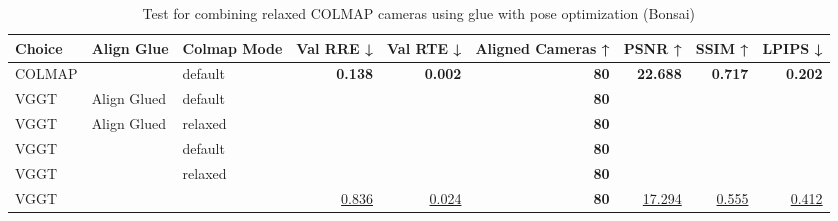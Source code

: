 \begin{table}[H]
\caption{Test for combining relaxed COLMAP cameras using glue with pose optimization (Bonsai)}
\label{tab:99_align_glue_relaxed_pose_opt_bonsai}
\begin{tabular}{lllrrrrrr}
\toprule
Choice & Align Glue & Colmap Mode & Val RRE ↓ & Val RTE ↓ & Aligned Cameras ↑ & PSNR ↑ & SSIM ↑ & LPIPS ↓ \\
\midrule
COLMAP &  & default & \textbf{0.138} & \textbf{0.002} & \textbf{80} & \textbf{22.688} & \textbf{0.717} & \textbf{0.202} \\
VGGT & Align Glued & default &  &  & \textbf{80} &  &  &  \\
VGGT & Align Glued & relaxed &  &  & \textbf{80} &  &  &  \\
VGGT &  & default &  &  & \textbf{80} &  &  &  \\
VGGT &  & relaxed &  &  & \textbf{80} &  &  &  \\
VGGT &  &  & \underline{0.836} & \underline{0.024} & \textbf{80} & \underline{17.294} & \underline{0.555} & \underline{0.412} \\
\bottomrule
\end{tabular}
\end{table}
